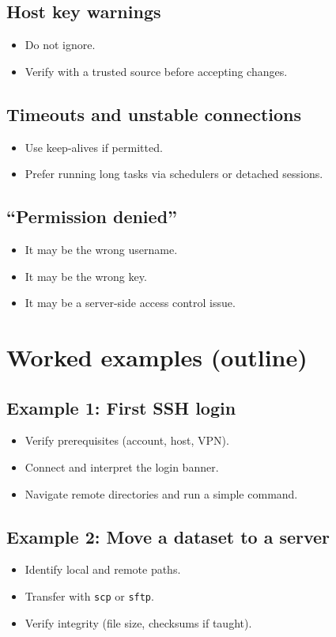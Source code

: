 \subsection{Host key warnings}
\begin{itemize}
\item Do not ignore.
\item Verify with a trusted source before accepting changes.
\end{itemize}

\subsection{Timeouts and unstable connections}
\begin{itemize}
\item Use keep-alives if permitted.
\item Prefer running long tasks via schedulers or detached sessions.
\end{itemize}

\subsection{``Permission denied''}
\begin{itemize}
\item It may be the wrong username.
\item It may be the wrong key.
\item It may be a server-side access control issue.
\end{itemize}

\section{Worked examples (outline)}
\subsection{Example 1: First SSH login}
\begin{itemize}
\item Verify prerequisites (account, host, VPN).
\item Connect and interpret the login banner.
\item Navigate remote directories and run a simple command.
\end{itemize}

\subsection{Example 2: Move a dataset to a server}
\begin{itemize}
\item Identify local and remote paths.
\item Transfer with \texttt{scp} or \texttt{sftp}.
\item Verify integrity (file size, checksums if taught).
\end{itemize}

